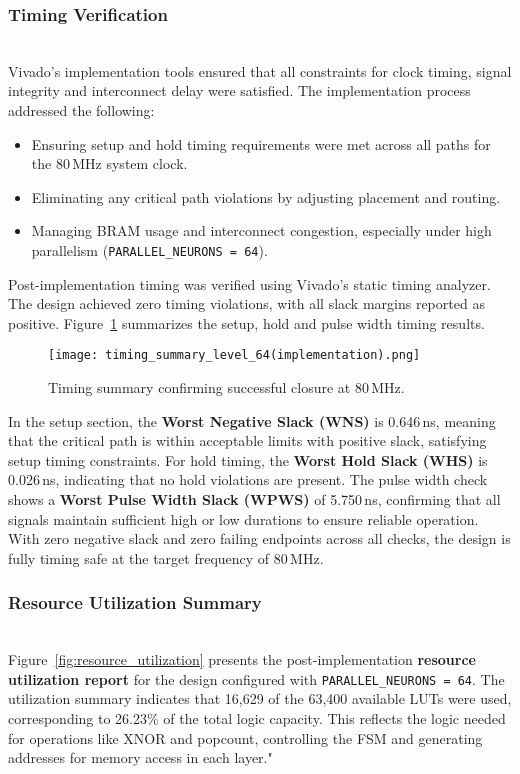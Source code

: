 \documentclass[a4paper,12pt]{report}
\begin{document}
\subsubsection{Timing Verification} \hfill\\
Vivado's implementation tools ensured that all constraints for clock timing, signal integrity and interconnect delay were satisfied. The implementation process addressed the following:
\begin{itemize}
    \item Ensuring setup and hold timing requirements were met across all paths for the 80\,MHz system clock.
    \item Eliminating any critical path violations by adjusting placement and routing.
    \item Managing BRAM usage and interconnect congestion, especially under high parallelism (\texttt{PARALLEL\_NEURONS = 64}).
\end{itemize}

Post-implementation timing was verified using Vivado's static timing analyzer. The design achieved zero timing violations, with all slack margins reported as positive. Figure~\ref{fig:timing_summary} summarizes the setup, hold and pulse width timing results.

\begin{figure}[H]
    \centering
    \texttt{[image: timing\_summary\_level\_64(implementation).png]}
    \caption{Timing summary confirming successful closure at 80\,MHz.}
    \label{fig:timing_summary}
\end{figure}
In the setup section, the \textbf{Worst Negative Slack (WNS)} is 0.646\,ns, meaning that the critical path is within acceptable limits with positive slack, satisfying setup timing constraints. For hold timing, the \textbf{Worst Hold Slack (WHS)} is 0.026\,ns, indicating that no hold violations are present. The pulse width check shows a \textbf{Worst Pulse Width Slack (WPWS)} of 5.750\,ns, confirming that all signals maintain sufficient high or low durations to ensure reliable operation. With zero negative slack and zero failing endpoints across all checks, the design is fully timing safe at the target frequency of 80\,MHz.
\subsubsection{Resource Utilization Summary} \hfill\\
Figure~\ref{fig:resource_utilization} presents the post-implementation \textbf{resource utilization report} for the design configured with \texttt{PARALLEL\_NEURONS = 64}. The utilization summary indicates that 16,629 of the 63,400 available LUTs were used, corresponding to 26.23\% of the total logic capacity. This reflects the logic needed for operations like XNOR and popcount, controlling the FSM and generating addresses for memory access in each layer."
\end{document}
